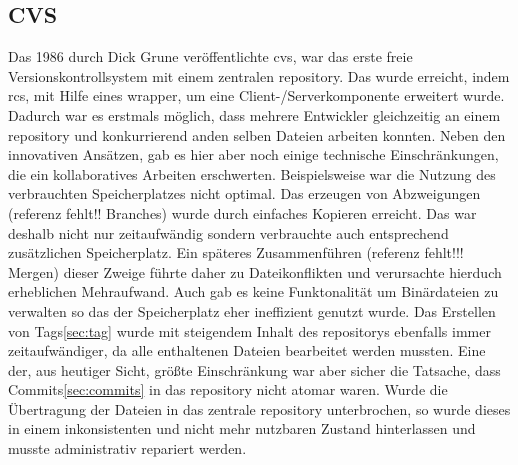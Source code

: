 \subsection{CVS}\label{sec:cvs}
Das 1986 durch Dick Grune veröffentlichte \acrfull{cvs}, war das erste freie
Versionskontrollsystem mit einem zentralen \gls{repository}. Das wurde
erreicht, indem \acrshort{rcs}, mit Hilfe eines \gls{wrapper}, um eine
Client-/Serverkomponente erweitert wurde. Dadurch war es erstmals möglich, dass
mehrere Entwickler gleichzeitig an einem \gls{repository} und konkurrierend
anden selben Dateien arbeiten konnten. Neben den innovativen Ansätzen, gab es
hier aber noch einige technische Einschränkungen, die ein kollaboratives
Arbeiten erschwerten. Beispielsweise war die Nutzung des verbrauchten
Speicherplatzes nicht optimal. Das erzeugen von Abzweigungen (referenz fehlt!!
Branches) wurde durch einfaches Kopieren erreicht. Das war deshalb nicht nur
zeitaufwändig sondern verbrauchte auch entsprechend zusätzlichen Speicherplatz.
Ein späteres Zusammenführen (referenz fehlt!!! Mergen) dieser Zweige führte
daher zu Dateikonflikten und verursachte hierduch erheblichen Mehraufwand. Auch
gab es keine Funktonalität um Binärdateien zu verwalten so das der
Speicherplatz eher ineffizient genutzt wurde. Das Erstellen von
Tags\ref{sec:tag} wurde mit steigendem Inhalt des \glspl{repository} ebenfalls
immer zeitaufwändiger, da alle enthaltenen Dateien bearbeitet werden mussten.
Eine der, aus heutiger Sicht, größte Einschränkung war aber sicher die
Tatsache, dass Commits\ref{sec:commits} in das \gls{repository} nicht atomar
waren. Wurde die Übertragung der Dateien in das zentrale \gls{repository}
unterbrochen, so wurde dieses in einem inkonsistenten und nicht mehr nutzbaren
Zustand hinterlassen und musste administrativ repariert
werden.\cite[S.~382-383]{cd}

